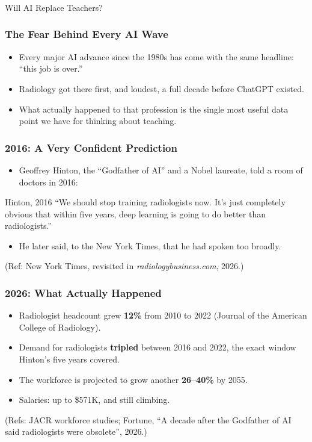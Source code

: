 \begin{frame}[fragile]\frametitle{}
\begin{center}
{\Large Will AI Replace Teachers?}
\end{center}
\end{frame}

\begin{frame}[fragile]\frametitle{The Fear Behind Every AI Wave}
\begin{itemize}
\item Every major AI advance since the 1980s has come with the same headline: ``this job is over.''
\item Radiology got there first, and loudest, a full decade before ChatGPT existed.
\item What actually happened to that profession is the single most useful data point we have for thinking about teaching.
\end{itemize}
\end{frame}

\begin{frame}[fragile]\frametitle{2016: A Very Confident Prediction}
\begin{itemize}
\item Geoffrey Hinton, the ``Godfather of AI'' and a Nobel laureate, told a room of doctors in 2016:
\end{itemize}
\begin{alertblock}{Hinton, 2016}
``We should stop training radiologists now. It's just completely obvious that within five years, deep learning is going to do better than radiologists.''
\end{alertblock}
\begin{itemize}
\item He later said, to the New York Times, that he had spoken too broadly.
\end{itemize}
{\tiny (Ref: New York Times, revisited in \emph{radiologybusiness.com}, 2026.)}
\end{frame}

\begin{frame}[fragile]\frametitle{2026: What Actually Happened}
\begin{itemize}
\item Radiologist headcount grew \textbf{12\%} from 2010 to 2022 (Journal of the American College of Radiology).
\item Demand for radiologists \textbf{tripled} between 2016 and 2022, the exact window Hinton's five years covered.
\item The workforce is projected to grow another \textbf{26--40\%} by 2055.
\item Salaries: up to \$571K, and still climbing.
\end{itemize}
{\tiny (Refs: JACR workforce studies; Fortune, ``A decade after the Godfather of AI said radiologists were obsolete'', 2026.)}
\end{frame}

